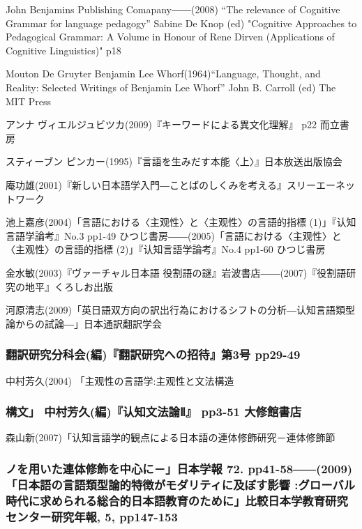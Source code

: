 John Benjamins Publishing Comapany――(2008) ``The relevance of Cognitive Grammar for language pedagogy'' 
Sabine De Knop (ed) "Cognitive Approaches to Pedagogical Grammar: A Volume in Honour of Rene Dirven 
(Applications of Cognitive Linguistics)" p18 

Mouton De Gruyter Benjamin Lee Whorf(1964)``Language, Thought, and Reality: Selected Writings of Benjamin Lee Whorf'' 
John B. Carroll (ed) The MIT Press

アンナ ヴィエルジュビツカ(2009)『キーワードによる異文化理解』 p22 而立書房

スティーブン ピンカー(1995)『言語を生みだす本能〈上〉』日本放送出版協会

庵功雄(2001)『新しい日本語学入門―ことばのしくみを考える』スリーエーネットワーク

池上嘉彦(2004)「言語における〈主观性〉と〈主观性〉の言語的指標 (1)」『认知言語学論考』No.3 pp1-49 ひつじ書房――(2005)「言語における〈主观性〉と〈主观性〉の言語的指標 (2)」『认知言語学論考』No.4 pp1-60 ひつじ書房

金水敏(2003)『ヴァーチャル日本語 役割語の謎』岩波書店――(2007)『役割語研究の地平』くろしお出版

河原清志(2009)「英日語双方向の訳出行為におけるシフトの分析―认知言語類型論からの試論―」日本通訳翻訳学会\subsubsection{翻訳研究分科会(編)『翻訳研究への招待』第3号 pp29-49}

中村芳久(2004) 「主观性の言語学:主观性と文法構造\subsubsection{構文」 中村芳久(編)『认知文法論Ⅱ』 pp3-51 大修館書店}

森山新(2007)「认知言語学的観点による日本語の連体修飾研究－連体修飾節\subsubsection{ノを用いた連体修飾を中心に－」日本学報 72. pp41-58――(2009)「日本語の言語類型論的特徴がモダリティに及ぼす影響 :グローバル時代に求められる総合的日本語教育のために」比較日本学教育研究センター研究年報, 5, pp147-153}
